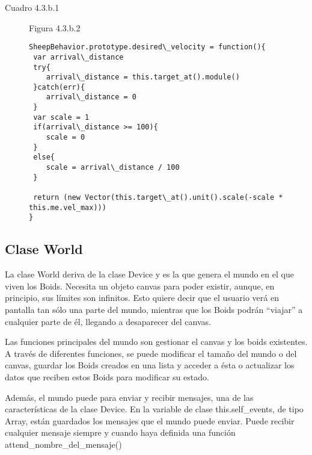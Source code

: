  Cuadro 4.3.b.1

 \begin{figure}[p]
Figura 4.3.b.2
\begin{verbatim}
SheepBehavior.prototype.desired\_velocity = function(){
 var arrival\_distance
 try{
    arrival\_distance = this.target_at().module()
 }catch(err){
    arrival\_distance = 0
 }
 var scale = 1
 if(arrival\_distance >= 100){
    scale = 0
 }
 else{
    scale = arrival\_distance / 100
 }

 return (new Vector(this.target\_at().unit().scale(-scale * this.me.vel_max)))
}
\end{verbatim}
 \end{figure}


\subsection{Clase World}
\label{subsection:world}

La clase World deriva de la clase Device y es la que genera el mundo en el que viven los Boids. Necesita un objeto canvas para poder 
existir, aunque, en principio, sus límites son infinitos. Esto quiere decir que el usuario verá en pantalla tan sólo una parte del mundo, 
mientras que los Boids podrán “viajar” a cualquier parte de él, llegando a desaparecer del canvas.

Las funciones principales del mundo son gestionar el canvas y los boids existentes. A través de diferentes funciones, se puede modificar 
el tamaño del mundo o del canvas, guardar los Boids creados en una lista y acceder a ésta o actualizar los datos que reciben estos Boids 
para modificar su estado.

Además, el mundo puede para enviar y recibir mensajes, una de las características de la clase Device. En la variable de clase 
this.self\_events, de tipo Array, están guardados los mensajes que el mundo puede enviar. Puede recibir cualquier mensaje siempre y cuando
haya definida una función attend\_nombre\_del\_mensaje()


